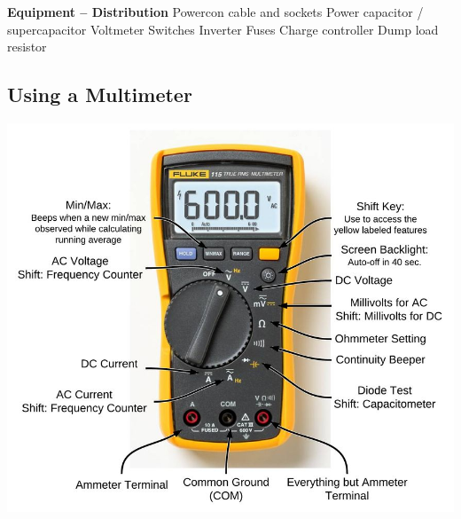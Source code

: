 \documentclass{article}
\theoremstyle{definition}
\theoremstyle{definition}
\theoremstyle{remark}
\begin{document}
    \textbf{Equipment – Distribution} \newline
    Powercon cable and sockets \newline
    Power capacitor / supercapacitor \newline
    Voltmeter \newline
    Switches \newline
    Inverter \newline
    Fuses \newline
    Charge controller \newline
    Dump load resistor
  

  \subsection{Using a Multimeter} %
  \label{sub:using_a_multimeter}

    \begin{center}
      \includegraphics[width=0.45\paperwidth]{Images/image_a_1_(multimeter).png}
    \end{center}
  

\end{document}
